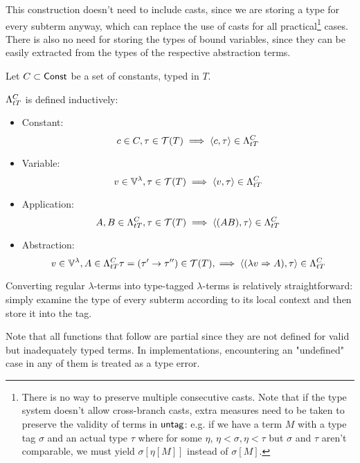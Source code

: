 \documentclass[main.tex]{subfiles}
\begin{document}
This construction doesn't need to include casts, since we are storing
a type for every subterm anyway, which can replace the use of casts for all
practical\footnote{
    There is no way to preserve multiple consecutive casts. Note that if the
    type system doesn't allow cross-branch casts, extra measures need to be taken
    to preserve the validity of terms in $\mcf{untag}$: e.g. if we have a
    term $M$ with a type tag $\sigma$ and an actual type $\tau$ where for some $\eta$,
    $\eta \less \sigma, \eta \less \tau$ but $\sigma$ and $\tau$ aren't comparable,
    we must yield $\sigma[\eta[M]]$ instead of $\sigma[M]$.
} cases. There is also no need for storing the types of bound variables, since
they can be easily extracted from the types of the respective abstraction terms.
\begin{defn}
    Let $C \subset \const$ be a set of constants, typed in $T$.

    $\ttlambda{T}{C}$ is defined inductively:
    \begin{itemize}
        \item Constant:
            \[ c \in C, \tau \in \tclos{T} \implies \ttt{c}{\tau} \in \ttlambda{T}{C} \]
        \item Variable:
            \[ v \in \lvars, \tau \in \tclos{T} \implies \ttt{v}{\tau} \in \ttlambda{T}{C} \]
        \item Application:
            \[ A, B \in \ttlambda{T}{C}, \tau \in \tclos{T} \implies \ttt{(AB)}{\tau} \in \ttlambda{T}{C} \]
        \item Abstraction:
            \[ v \in \lvars, A \in \ttlambda{T}{C}
                \tau = (\tau' \tot \tau'') \in \tclos{T},
                \implies \ttt{(\lambda v \abstr A)}{\tau} \in \ttlambda{T}{C} \]
    \end{itemize}
\end{defn}

Converting regular $\lambda$-terms into type-tagged $\lambda$-terms is
relatively straightforward: simply examine the type of every subterm according
to its local context and then store it into the tag.

Note that all functions that follow are partial since they are not defined for
valid but inadequately typed terms. In implementations,
encountering an "undefined" case in any of them is treated as a type error.
\end{document}
